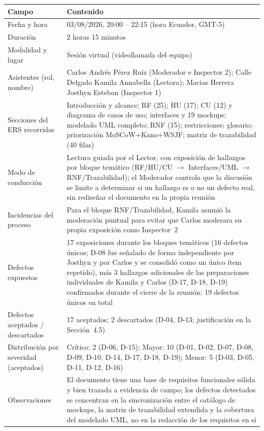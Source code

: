 \documentclass[11pt,a4paper]{article}
\begin{document}
\begin{longtable}{|p{4.5cm}|p{9.5cm}|}
\hline
\textbf{Campo} & \textbf{Contenido} \\
\hline
Fecha y hora & 03/08/2026, 20:00 -- 22:15 (hora Ecuador, GMT-5) \\
\hline
Duración & 2 horas 15 minutos \\
\hline
Modalidad y lugar & Sesión virtual (videollamada del equipo) \\
\hline
Asistentes (rol, nombre) & Carlos Andrés Pérez Ruíz (Moderador e Inspector 2); Calle Delgado Kamila Annabella (Lectora); Macias Herrera Josthyn Esteban (Inspector 1) \\
\hline
Secciones del ERS recorridas & Introducción y alcance; RF (25); HU (17); CU (12) y diagrama de casos de uso; interfaces y 19 mockups; modelado UML completo; RNF (15); restricciones; glosario; priorización MoSCoW+Kano+WSJF; matriz de trazabilidad (40 filas) \\
\hline
Modo de conducción & Lectura guiada por el Lector, con exposición de hallazgos por bloque temático (RF/HU/CU $\rightarrow$ Interfaces/UML $\rightarrow$ RNF/Trazabilidad); el Moderador controla que la discusión se limite a determinar si un hallazgo es o no un defecto real, sin rediseñar el documento en la propia reunión \\
\hline
Incidencias del proceso & Para el bloque RNF/Trazabilidad, Kamila asumió la moderación puntual para evitar que Carlos moderara su propia exposición como Inspector~2 \\
\hline
Defectos expuestos & 17 exposiciones durante los bloques temáticos (16 defectos únicos; D-08 fue señalado de forma independiente por Josthyn y por Carlos y se consolidó como un único ítem repetido), más 3 hallazgos adicionales de las preparaciones individuales de Kamila y Carlos (D-17, D-18, D-19) confirmados durante el cierre de la reunión: 19 defectos únicos en total \\
\hline
Defectos aceptados / descartados & 17 aceptados; 2 descartados (D-04, D-13; justificación en la Sección~4.5) \\
\hline
Distribución por severidad (aceptados) & Crítico: 2 (D-06, D-15); Mayor: 10 (D-01, D-02, D-07, D-08, D-09, D-10, D-14, D-17, D-18, D-19); Menor: 5 (D-03, D-05, D-11, D-12, D-16) \\
\hline
Observaciones & El documento tiene una base de requisitos funcionales sólida y bien trazada a evidencia de campo; los defectos detectados se concentran en la sincronización entre el catálogo de mockups, la matriz de trazabilidad extendida y la cobertura del modelado UML, no en la redacción de los requisitos en sí \\

\end{longtable}
\end{document}
